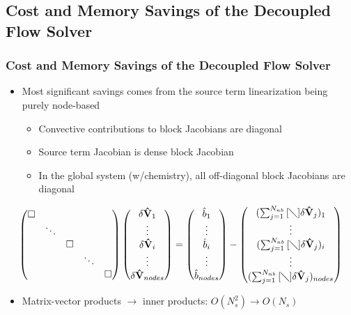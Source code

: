 \documentclass{beamer}
\begin{document}
\subsection{Cost and Memory Savings of the Decoupled Flow Solver}

\begin{frame}
  \frametitle{Cost and Memory Savings of the Decoupled Flow Solver}
\begin{itemize}
  \item Most significant savings comes from the source term linearization being purely node-based
    \begin{itemize}
      \item Convective contributions to block Jacobians are diagonal
      \item Source term Jacobian is dense block Jacobian
      \item In the global system (w/chemistry), all off-diagonal block Jacobians
        are diagonal
    \end{itemize}
  \end{itemize}
  \[
    \begin{pmatrix} 
      \Box & & & & \\ 
      & \ddots & & & \\ 
      & & \Box \\ 
      & & & \ddots & \\ 
      & & & & \Box
    \end{pmatrix} \begin{pmatrix} \delta \mathbf{\hat{V}}_1 \\ \vdots \\ \delta
      \mathbf{\hat{V}}_i \\ \vdots \\ \delta \mathbf{\hat{V}}_{nodes}
    \end{pmatrix} = \begin{pmatrix} \hat{b}_1 \\ \vdots \\ \hat{b}_i \\ \vdots \\
      \hat{b}_{nodes} \end{pmatrix} - \begin{pmatrix}
      (\sum_{j=1}^{N_{nb}}{[\diagdown] \delta\mathbf{\hat{V}}_{j}})_1 \\ \vdots \\
      (\sum_{j=1}^{N_{nb}}{[\diagdown] \delta\mathbf{\hat{V}}_{j}})_i \\ \vdots \\
      (\sum_{j=1}^{N_{nb}}{[\diagdown] \delta\mathbf{\hat{V}}_{j}})_{nodes}
    \end{pmatrix} 
  \]
  \begin{itemize}
    \item Matrix-vector products $\to$ inner products: $O(N_s^2) \to O(N_s)$
  \end{itemize}
\end{frame}
\end{document}
